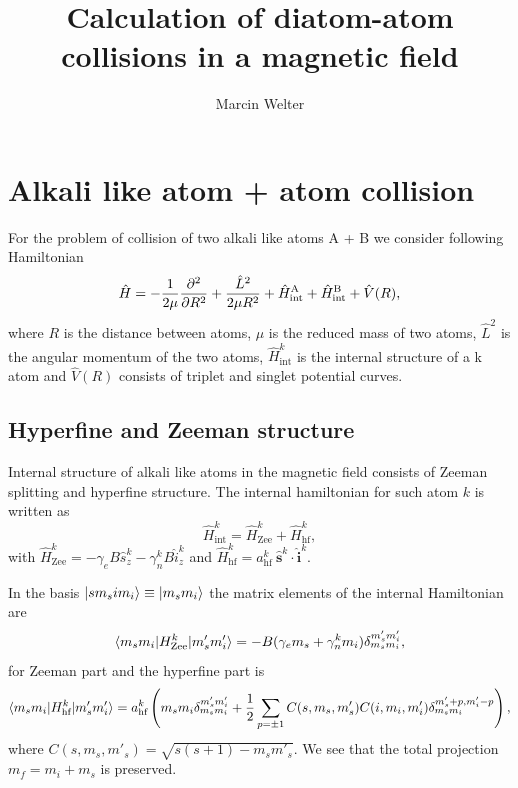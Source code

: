 \documentclass[a4paper]{article}
\title{Calculation of diatom-atom collisions in a magnetic field}
\author{Marcin Welter}
\begin{document}
\maketitle


\section{Alkali like atom + atom collision}\label{sec:atom_atom}
    For the problem of collision of two alkali like atoms A + B we consider following Hamiltonian
    \begin{equation}
        \hat{H} = -\frac{1}{2\mu}\pdv[order=2]{}{R} + \frac{\hat{L}^2}{2\mu R^2}
            + \hat{H}^\text{A}_\text{int} + \hat{H}^\text{B}_\text{int} + \hat{V}(R),
    \end{equation}
    where $R$ is the distance between atoms, $\mu$ is the reduced mass of two atoms, 
    \(\hat{L}^2\) is the angular momentum of the two atoms,
    \(\hat{H}^k_\text{int}\) is the internal structure of a k atom and \(\hat{V}(R)\) 
    consists of triplet and singlet potential curves.

\subsection{Hyperfine and Zeeman structure}
    Internal structure of alkali like atoms in the magnetic field consists of Zeeman splitting and
    hyperfine structure. The internal hamiltonian for such atom $k$ is written as
    \begin{equation}\label{eq:alkali_hamiltonian_int}
        \hat{H}^k_\text{int} = \hat{H}^k_\text{Zee} + \hat{H}^k_\text{hf},
    \end{equation}
    with \(\hat{H}^k_\text{Zee} = -\gamma_e B \hat{s}^k_z - \gamma^k_n B \hat{i}^k_z\) and 
    \(\hat{H}^k_\text{hf} = a^k_\text{hf} \ \hat{\mathbf{s}}^k \cdot \hat{\mathbf{i}}^k\).

    In the basis \(\ket{s m_s i m_i} \equiv \ket{m_s m_i}\) the matrix elements of the internal Hamiltonian are
    \begin{equation}
        \braket{m_s m_i | H^k_\text{Zee} | m'_s m'_i} = -B(\gamma_e m_s + \gamma^k_n m_i) \delta^{m'_s m'_i}_{m_s m_i},
    \end{equation}
    for Zeeman part and the hyperfine part is
    \begin{equation}
        \braket{m_s m_i | H^k_\text{hf} | m'_s m'_i} = a^k_\text{hf} 
            \left(
                m_s m_i \delta_{m_s m_i}^{m'_s m'_i} 
                + \frac{1}{2}\sum_{p = \pm 1} C(s, m_s, m'_s) C(i, m_i, m'_i)\delta_{m_s m_i}^{m'_s + p, m'_i - p}
            \right),
    \end{equation}
    where \(C(s, m_s, m'_s) = \sqrt{s(s + 1) - m_s m'_s}\). 
    We see that the total projection $m_f = m_i + m_s$ is preserved.
\end{document}
